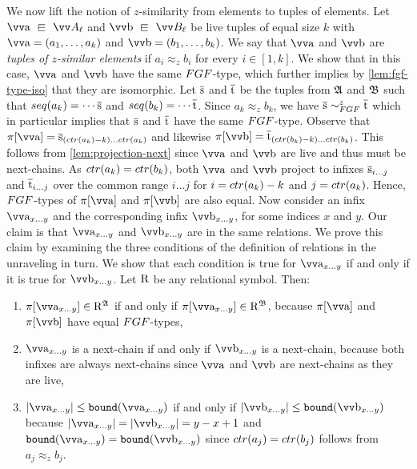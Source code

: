We now lift the notion of $z$-similarity from elements to tuples of elements.
Let $\elemtuptuplea \sqin \unraveldom{A}_{\ell}$ and $\elemtuptupleb \sqin \unraveldom{B}_{\ell}$ be live tuples of equal size $k$ with $\elemtuptuplea = (a_{1}, \ldots, a_{k})$ and $\elemtuptupleb = (b_{1}, \ldots, b_{k})$.
We say that $\elemtuptuplea$ and $\elemtuptupleb$ are \emph{tuples of $z$-similar elements} if $a_{i} \approx_{z} b_{i}$ for every $i \in [1,k]$.
We show that in this case, $\elemtuptuplea$ and $\elemtuptupleb$ have the same $\FGF$-type, which further implies by \cref{lem:fgf-type-iso} that they are isomorphic.
Let $\overline{\mathrm{s}}$ and $\overline{\mathrm{t}}$ be the tuples from ${\mathfrak{A}}$ and ${\mathfrak{B}}$ such that $\seq{a_{k}} = \cdots \elemtuples$ and $\seq{b_{k}} = \cdots \elemtuplet$.
Since $a_{k} \approx_z b_{k}$, we have $\elemtuples \bisimto_{\FGF}^{z} \elemtuplet$ which in particular implies that $\overline{\mathrm{s}}$ and $\overline{\mathrm{t}}$ have the same $\FGF$-type.
Observe that $\pi[\elemtuptuplea] = \elemtuples_{(\ctr{a_{k}}-k)\ldots{}\ctr{a_{k}}}$ and likewise $\pi[\elemtuptupleb] = \elemtuplet_{(\ctr{b_{k}}-k)\ldots{}\ctr{b_{k}}}$.
This follows from \cref{lem:projection-next} since $\elemtuptuplea$ and $\elemtuptupleb$ are live and thus must be next-chains.
As $\ctr{a_{k}} = \ctr{b_{k}}$, both $\elemtuptuplea$ and $\elemtuptupleb$ project to infixes $\overline{\mathrm{s}}_{i\ldots{}j}$ and $\overline{\mathrm{t}}_{i\ldots{}j}$ over the common range $i\ldots{}j$ for $i = \ctr{a_{k}} - k$ and $j = \ctr{a_{k}}$.
Hence, $\FGF$-types of $\pi[\elemtuptuplea]$ and $\pi[\elemtuptupleb]$ are also equal.
Now consider an infix $\elemtuptuplea_{x\ldots{}y}$ and the corresponding infix $\elemtuptupleb_{x\ldots{}y}$, for some indices $x$ and $y$.
Our claim is that $\elemtuptuplea_{x\ldots{}y}$ and $\elemtuptupleb_{x\ldots{}y}$ are in the same relations.
We prove this claim by examining the three conditions of the definition of relations in the unraveling in turn.
We show that each condition is true for $\elemtuptuplea_{x\ldots{}y}$ if and only if it is true for $\elemtuptupleb_{x\ldots{}y}$.
Let $\mathrm{R}$ be any relational symbol. Then:
\begin{enumerate}
  \item $\pi[\elemtuptuplea_{x\ldots{}y}] \in \relR^{\str{A}}$ if and only if $\pi[\elemtuptuplea_{x\ldots{}y}] \in \relR^{\str{B}}$, because $\pi[\elemtuptuplea]$ and $\pi[\elemtuptupleb]$ have equal $\FGF$-types,
  \item $\elemtuptuplea_{x\ldots{}y}$ is a next-chain if and only if $\elemtuptupleb_{x\ldots{}y}$ is a next-chain, because both infixes are always next-chains since $\elemtuptuplea$ and $\elemtuptupleb$ are next-chains as they are live,
  \item $|\elemtuptuplea_{x\ldots{}y}| \le \mathtt{bound}(\elemtuptuplea_{x\ldots{}y})$ if and only if $|\elemtuptupleb_{x\ldots{}y}| \le \mathtt{bound}(\elemtuptupleb_{x\ldots{}y})$ because $|\elemtuptuplea_{x\ldots{}y}| = |\elemtuptupleb_{x\ldots{}y}| = y-x+1$ and $\mathtt{bound}(\elemtuptuplea_{x\ldots{}y}) = \mathtt{bound}(\elemtuptupleb_{x\ldots{}y})$ since $\ctr{a_{j}} = \ctr{b_{j}}$ follows from $a_{j} \approx_{z} b_{j}$.
\end{enumerate}
